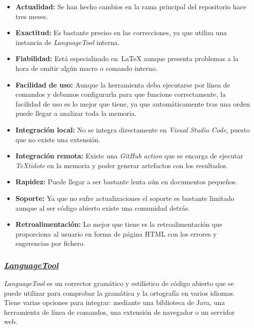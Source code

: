 \begin{itemize}
    \item[\bien] \textbf{Actualidad:}  Se han hecho cambios en la rama principal del repositorio hace tres meses.
    \item[\bien] \textbf{Exactitud:} Es bastante preciso en las correcciones, ya que utiliza una instancia de \textit{LanguageTool} interna.
    \item[\regular] \textbf{Fiabilidad:} Está especializado en~\LaTeX{} aunque presenta problemas a la hora de omitir algún macro o comando interno.
    \item[\esp] \textbf{Facilidad de uso:} Aunque la herramienta deba ejecutarse por línea de comandos y debamos configurarla para que funcione correctamente, la facilidad de uso es lo mejor que tiene, ya que automáticamente tras una orden puede llegar a analizar toda la memoria.
    \item[\mal] \textbf{Integración local:} No se integra directamente en \textit{Visual Studio Code}, puesto que no existe una extensión.
    \item[\bien] \textbf{Integración remota:} Existe una \textit{GitHub action} que se encarga de ejecutar \textit{TeXtidote} en la memoria y poder generar artefactos con los resultados. 
    \item[\regular] \textbf{Rapidez:} Puede llegar a ser bastante lenta aún en documentos pequeños.
    \item[\regular] \textbf{Soporte:} Ya que no sufre actualizaciones el soporte es bastante limitado aunque al ser código abierto existe una comunidad detrás.
    \item[\bien] \textbf{Retroalimentación:} Lo mejor que tiene es la retroalimentación que proporciona al usuario en forma de página HTML con los errores y sugerencias por fichero.
\end{itemize}

\subsubsection{\href{https://github.com/languagetool-org/languagetool}{\textit{LanguageTool}}}\label{sec:languagetool}

\textit{LanguageTool} es un corrector gramático y estilístico de código abierto que se puede utilizar para comprobar la gramática y la ortografía en varios idiomas. Tiene varias opciones para integrar: mediante una biblioteca de Java, una herramienta de línea de comandos, una extensión de navegador o un servidor web.

